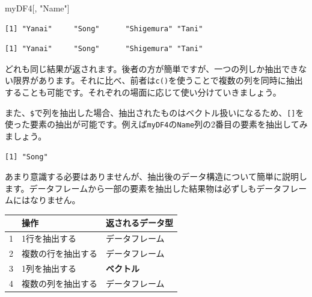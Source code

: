 \documentclass[
  a4paper,
  pandoc,
  ja=standard,
  jafont=haranoaji]{bxjsbook}
\newenvironment{Shaded}{\begin{snugshade}}{\end{snugshade}}
\newcommand{\DecValTok}[1]{\textcolor[rgb]{0.68,0.00,0.00}{#1}}
\newcommand{\NormalTok}[1]{\textcolor[rgb]{0.00,0.48,0.65}{#1}}
\newcommand{\SpecialCharTok}[1]{\textcolor[rgb]{0.37,0.37,0.37}{#1}}
\newcommand{\StringTok}[1]{\textcolor[rgb]{0.13,0.47,0.30}{#1}}
\begin{document}
\begin{Shaded}
\begin{Highlighting}[numbers=left,,]
\NormalTok{myDF4[, }\StringTok{"Name"}\NormalTok{]}
\end{Highlighting}
\end{Shaded}

\begin{verbatim}
[1] "Yanai"     "Song"      "Shigemura" "Tani"     
\end{verbatim}

\begin{Shaded}
\end{Shaded}

\begin{verbatim}
[1] "Yanai"     "Song"      "Shigemura" "Tani"     
\end{verbatim}

どれも同じ結果が返されます。後者の方が簡単ですが、一つの列しか抽出できない限界があります。それに比べ、前者は\texttt{c()}を使うことで複数の列を同時に抽出することも可能です。それぞれの場面に応じて使い分けていきましょう。

また、\texttt{\$}で列を抽出した場合、抽出されたものはベクトル扱いになるため、\texttt{{[}{]}}を使った要素の抽出が可能です。例えば\texttt{myDF4}の\texttt{Name}列の2番目の要素を抽出してみましょう。

\begin{Shaded}
\end{Shaded}

\begin{verbatim}
[1] "Song"
\end{verbatim}

あまり意識する必要はありませんが、抽出後のデータ構造について簡単に説明します。データフレームから一部の要素を抽出した結果物は必ずしもデータフレームにはなりません。

\begin{longtable}[]{@{}lll@{}}
\toprule
& 操作 & 返されるデータ型 \\
\midrule
\endhead
1 & 1行を抽出する & データフレーム \\
2 & 複数の行を抽出する & データフレーム \\
3 & 1列を抽出する & \textbf{ベクトル} \\
4 & 複数の列を抽出する & データフレーム \\
\bottomrule
\end{longtable}
\end{document}
